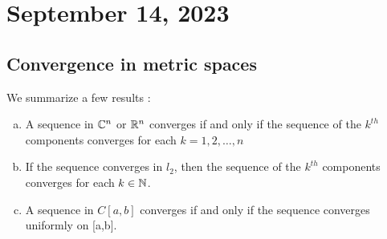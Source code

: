 \newpage
\section{September 14, 2023}
\subsection{Convergence in metric spaces}
\begin{theorem}
    We summarize a few results :
    \begin{enumerate}[(a)]
        \item A sequence in $\mathbb C^n$ or $\mathbb R^n$ converges if and only if the sequence of the $k^{th}$ components converges for each $k = 1, 2, \dots, n$
        \item If the sequence converges in $l_2$, then the sequence of the $k^{th}$ components converges for each $k \in \mathbb N$.
        \item A sequence in $C[a,b]$ converges if and only if the sequence converges uniformly on [a,b].
    \end{enumerate}
\end{theorem}